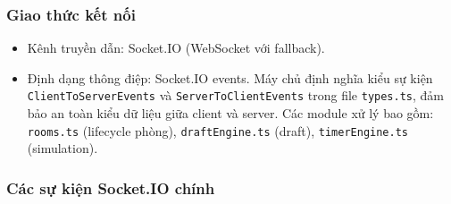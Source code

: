 \subsubsection{Giao thức kết nối}

\begin{itemize}[topsep=0pt, itemsep=2.5pt, leftmargin=1.5cm]
    \item Kênh truyền dẫn: Socket.IO (WebSocket với fallback).
    \item Định dạng thông điệp: Socket.IO events. Máy chủ định nghĩa kiểu sự kiện \texttt{ClientToServerEvents} và \texttt{ServerToClientEvents} trong file \texttt{types.ts}, đảm bảo an toàn kiểu dữ liệu giữa client và server. Các module xử lý bao gồm: \texttt{rooms.ts} (lifecycle phòng), \texttt{draftEngine.ts} (draft), \texttt{timerEngine.ts} (simulation).
\end{itemize}

\subsubsection*{Các sự kiện Socket.IO chính}

